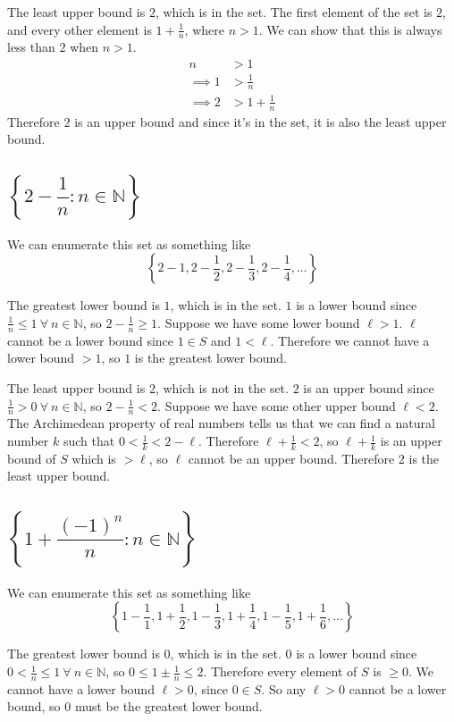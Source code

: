 \documentclass[a4paper]{article}
\begin{document}
The least upper bound is $2$, which is in the set. The first element of the set is $2$, and every other element is $1 + \frac1n$, where $n > 1$. We can show that this is always less than $2$ when $n > 1$.
\begin{align*}
	n &> 1\\
	\implies 1 &> \frac1n\\
	\implies 2 &> 1 + \frac1n
\end{align*}
Therefore $2$ is an upper bound and since it's in the set, it is also the least upper bound.

\subsection{$\left\{ 2 - \dfrac{1}{n} : n \in \mathbb{N} \right\}$}

We can enumerate this set as something like $$\left\{ 2 - 1, 2 - \frac12, 2 - \frac13, 2 - \frac14, \ldots \right\}$$

The greatest lower bound is $1$, which is in the set. $1$ is a lower bound since $\frac1n \le 1\ \forall\ n \in \mathbb N$, so $2 - \frac1n \ge 1$. Suppose we have some lower bound $\ell > 1$. $\ell$ cannot be a lower bound since $1 \in S$ and $1 < \ell$. Therefore we cannot have a lower bound $> 1$, so $1$ is the greatest lower bound.

The least upper bound is $2$, which is not in the set. $2$ is an upper bound since $\frac1n > 0\ \forall\ n \in \mathbb N$, so $2 - \frac1n < 2$. Suppose we have some other upper bound $\ell < 2$. The Archimedean property of real numbers tells us that we can find a natural number $k$ such that $0 < \frac1k < 2 - \ell$. Therefore $\ell + \frac1k < 2$, so $\ell + \frac1k$ is an upper bound of $S$ which is $> \ell$, so $\ell$ cannot be an upper bound. Therefore $2$ is the least upper bound.

\subsection{$\left\{ 1 + \dfrac{(-1)^n}{n} : n \in \mathbb{N} \right\}$}

We can enumerate this set as something like $$\left\{ 1 - \frac11, 1 + \frac12, 1 - \frac13, 1 + \frac14, 1 - \frac15, 1 + \frac16, \ldots \right\}$$

The greatest lower bound is $0$, which is in the set. $0$ is a lower bound since $0 < \frac1n \le 1\ \forall\ n \in \mathbb N$, so $0 \le 1 \pm \frac1n \le 2$. Therefore every element of $S$ is $\ge 0$. We cannot have a lower bound $\ell > 0$, since $0 \in S$. So any $\ell > 0$ cannot be a lower bound, so $0$ must be the greatest lower bound.
\end{document}
